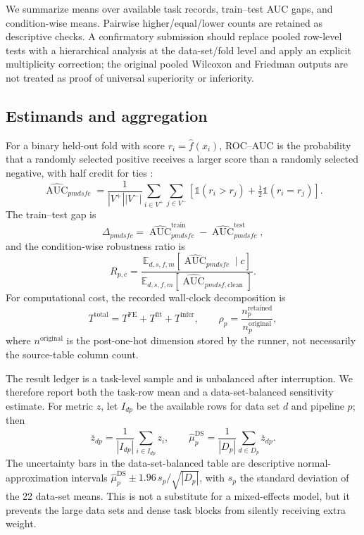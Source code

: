 \documentclass[preprint,12pt]{elsarticle}
\newcommand{\AUC}{\operatorname{AUC}}
\newcommand{\E}{\mathbb{E}}
\begin{document}
We summarize means over available task records, train--test AUC gaps, and condition-wise means.  Pairwise higher/equal/lower counts are retained as descriptive checks.  A confirmatory submission should replace pooled row-level tests with a hierarchical analysis at the data-set/fold level and apply an explicit multiplicity correction; the original pooled Wilcoxon and Friedman outputs are not treated as proof of universal superiority or inferiority.

\subsection{Estimands and aggregation}
For a binary held-out fold with score $r_i=\widehat f(x_i)$, ROC--AUC is the probability that a randomly selected positive receives a larger score than a randomly selected negative, with half credit for ties \citep{fawcett2006}:
\begin{equation}
  \widehat{\AUC}_{pmdsfc}=\frac{1}{|V^+||V^-|}
  \sum_{i\in V^+}\sum_{j\in V^-}
  \left[\mathbb{1}(r_i>r_j)+\tfrac12\mathbb{1}(r_i=r_j)\right].
\end{equation}
The train--test gap is
\begin{equation}
  \Delta_{pmdsfc}=\widehat{\AUC}^{\mathrm{train}}_{pmdsfc}-\widehat{\AUC}^{\mathrm{test}}_{pmdsfc},
\end{equation}
and the condition-wise robustness ratio is
\begin{equation}
  R_{p,c}=\frac{\E_{d,s,f,m}[\widehat{\AUC}_{p m d s f c}\mid c]}{\E_{d,s,f,m}[\widehat{\AUC}_{p m d s f,\mathrm{clean}}]}.
\end{equation}
For computational cost, the recorded wall-clock decomposition is
\begin{equation}
  T^{\mathrm{total}}=T^{\mathrm{FE}}+T^{\mathrm{fit}}+T^{\mathrm{infer}},
  \qquad
  \rho_{p}=\frac{n^{\mathrm{retained}}_{p}}{n^{\mathrm{original}}_{p}},
\end{equation}
where $n^{\mathrm{original}}$ is the post-one-hot dimension stored by the runner, not necessarily the source-table column count.

The result ledger is a task-level sample and is unbalanced after interruption.  We therefore report both the task-row mean and a data-set-balanced sensitivity estimate.  For metric $z$, let $I_{dp}$ be the available rows for data set $d$ and pipeline $p$; then
\begin{equation}
  \overline z_{dp}=\frac{1}{|I_{dp}|}\sum_{i\in I_{dp}}z_i,
  \qquad
  \widehat\mu^{\mathrm{DS}}_p=\frac{1}{|D_p|}\sum_{d\in D_p}\overline z_{dp}.
\end{equation}
The uncertainty bars in the data-set-balanced table are descriptive normal-approximation intervals $\widehat\mu^{\mathrm{DS}}_p\pm1.96\,s_p/\sqrt{|D_p|}$, with $s_p$ the standard deviation of the 22 data-set means.  This is not a substitute for a mixed-effects model, but it prevents the large data sets and dense task blocks from silently receiving extra weight.
\end{document}
